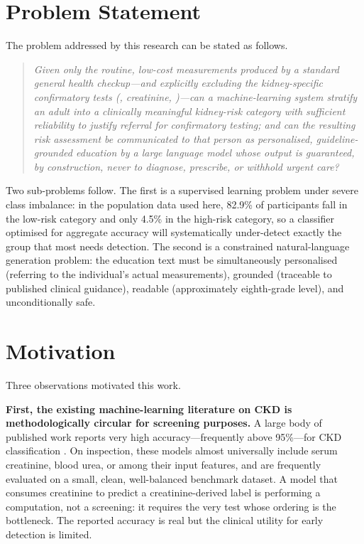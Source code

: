 \section{Problem Statement}
\label{sec:problem}

The problem addressed by this research can be stated as follows.

\begin{quote}
\emph{Given only the routine, low-cost measurements produced by a standard
general health checkup---and explicitly excluding the kidney-specific
confirmatory tests (\eGFR, creatinine, \UACR)---can a machine-learning system
stratify an adult into a clinically meaningful kidney-risk category with
sufficient reliability to justify referral for confirmatory testing; and can
the resulting risk assessment be communicated to that person as personalised,
guideline-grounded education by a large language model whose output is
guaranteed, by construction, never to diagnose, prescribe, or withhold urgent
care?}
\end{quote}

Two sub-problems follow. The first is a supervised learning problem under
severe class imbalance: in the population data used here, 82.9\% of
participants fall in the low-risk category and only 4.5\% in the high-risk
category, so a classifier optimised for aggregate accuracy will systematically
under-detect exactly the group that most needs detection. The second is a
constrained natural-language generation problem: the education text must be
simultaneously personalised (referring to the individual's actual measurements),
grounded (traceable to published clinical guidance), readable (approximately
eighth-grade level), and unconditionally safe.

\section{Motivation}
\label{sec:motivation}

Three observations motivated this work.

\textbf{First, the existing machine-learning literature on CKD is
methodologically circular for screening purposes.} A large body of published
work reports very high accuracy---frequently above 95\%---for CKD
classification \cite{chittora2021,aljaaf2019,yildirim2017}. On inspection,
these models almost universally include serum creatinine, blood urea, or
\eGFR{} among their input features, and are frequently evaluated on a small,
clean, well-balanced benchmark dataset. A model that consumes creatinine to
predict a creatinine-derived label is performing a computation, not a
screening: it requires the very test whose ordering is the bottleneck. The
reported accuracy is real but the clinical utility for early detection is
limited.

